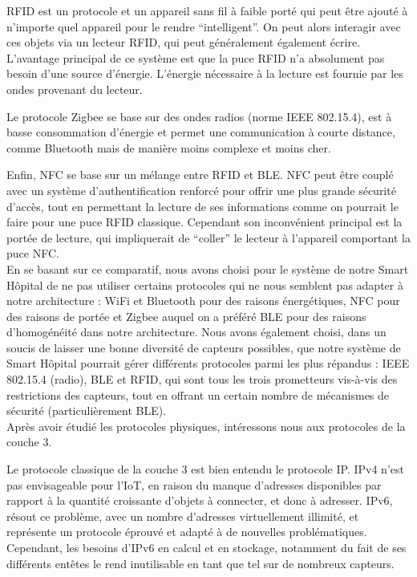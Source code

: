 \documentclass{article}
\begin{document}
RFID est un protocole et un appareil sans fil à faible porté qui peut être ajouté à n’importe quel appareil pour le rendre “intelligent”. On peut alors interagir avec ces objets via un lecteur RFID, qui peut généralement également écrire. L’avantage principal de ce système est que la puce RFID n’a absolument pas besoin d’une source d’énergie. L’énergie nécessaire à la lecture est fournie par les ondes provenant du lecteur.

Le protocole Zigbee se base sur des ondes radios (norme IEEE 802.15.4), est à basse consommation d’énergie et permet une communication à courte distance, comme Bluetooth mais de manière moins complexe et moins cher.

Enfin, NFC se base sur un mélange entre RFID et BLE. NFC peut être couplé avec un système d’authentification renforcé pour offrir une plus grande sécurité d’accès, tout en permettant la lecture de ses informations comme on pourrait le faire pour une puce RFID classique. Cependant son inconvénient principal est la portée de lecture, qui impliquerait de “coller” le lecteur à l’appareil comportant la puce NFC.
\\

En se basant sur ce comparatif, nous avons choisi pour le système de notre Smart Hôpital de ne pas utiliser certains protocoles qui ne nous semblent pas adapter à notre architecture : WiFi et Bluetooth pour des raisons énergétiques, NFC pour des raisons de portée et Zigbee auquel on a préféré BLE pour des raisons d'homogénéité dans notre architecture. Nous avons également choisi, dans un soucis de laisser une bonne diversité de capteurs possibles, que notre système de Smart Hôpital pourrait gérer différents protocoles parmi les plus répandus : IEEE 802.15.4 (radio), BLE et RFID, qui sont tous les trois prometteurs vis-à-vis des restrictions des capteurs, tout en offrant un certain nombre de mécanismes de sécurité (particulièrement BLE).
\\

Après avoir étudié les protocoles physiques, intéressons nous aux protocoles de la couche 3.

Le protocole classique de la couche 3 est bien entendu le protocole IP. IPv4 n’est pas envisageable pour l’IoT, en raison du manque d’adresses disponibles par rapport à la quantité croissante d’objets à connecter, et donc à adresser. IPv6, résout ce problème, avec un nombre d’adresses virtuellement illimité, et représente un protocole éprouvé et adapté à de nouvelles problématiques. Cependant, les besoins d’IPv6 en calcul et en stockage, notamment du fait de ses différents entêtes le rend inutilisable en tant que tel sur de nombreux capteurs.
\end{document}
